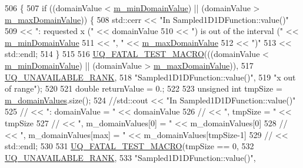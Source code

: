 \begin{DoxyCode}
506 \{
507   \textcolor{keywordflow}{if} ((domainValue < \hyperlink{class_q_u_e_s_o_1_1_base1_d1_d_function_a7b18b3854ee74ef5befbc67b75ebbdc5}{m\_minDomainValue}) || (domainValue > 
      \hyperlink{class_q_u_e_s_o_1_1_base1_d1_d_function_aa0025999ccab2145cd46c0a81e260e8f}{m\_maxDomainValue})) \{
508     std::cerr << \textcolor{stringliteral}{"In Sampled1D1DFunction::value()"}
509               << \textcolor{stringliteral}{": requested x ("}            << domainValue
510               << \textcolor{stringliteral}{") is out of the interval ("} << \hyperlink{class_q_u_e_s_o_1_1_base1_d1_d_function_a7b18b3854ee74ef5befbc67b75ebbdc5}{m\_minDomainValue}
511               << \textcolor{stringliteral}{", "}                         << \hyperlink{class_q_u_e_s_o_1_1_base1_d1_d_function_aa0025999ccab2145cd46c0a81e260e8f}{m\_maxDomainValue}
512               << \textcolor{stringliteral}{")"}
513               << std::endl;
514   \}
515 
516   \hyperlink{_defines_8h_a56d63d18d0a6d45757de47fcc06f574d}{UQ\_FATAL\_TEST\_MACRO}(((domainValue < \hyperlink{class_q_u_e_s_o_1_1_base1_d1_d_function_a7b18b3854ee74ef5befbc67b75ebbdc5}{m\_minDomainValue}) || (domainValue 
      > \hyperlink{class_q_u_e_s_o_1_1_base1_d1_d_function_aa0025999ccab2145cd46c0a81e260e8f}{m\_maxDomainValue})),
517                       \hyperlink{namespace_q_u_e_s_o_a7d4679800a430ae8e473c1c7bc0bfb21}{UQ\_UNAVAILABLE\_RANK},
518                       \textcolor{stringliteral}{"Sampled1D1DFunction::value()"},
519                       \textcolor{stringliteral}{"x out of range"});
520 
521   \textcolor{keywordtype}{double} returnValue = 0.;
522 
523   \textcolor{keywordtype}{unsigned} \textcolor{keywordtype}{int} tmpSize = \hyperlink{class_q_u_e_s_o_1_1_sampled1_d1_d_function_a6985db1a50a72a3fb1377645ac6cd944}{m\_domainValues}.size();
524   \textcolor{comment}{//std::cout << "In Sampled1D1DFunction::value()"}
525   \textcolor{comment}{//          << ": domainValue = "         << domainValue}
526   \textcolor{comment}{//          << ", tmpSize = "             << tmpSize}
527   \textcolor{comment}{//          << ", m\_domainValues[0] = "   << m\_domainValues[0]}
528   \textcolor{comment}{//          << ", m\_domainValues[max] = " << m\_domainValues[tmpSize-1]}
529   \textcolor{comment}{//          << std::endl;}
530 
531   \hyperlink{_defines_8h_a56d63d18d0a6d45757de47fcc06f574d}{UQ\_FATAL\_TEST\_MACRO}(tmpSize == 0,
532                       \hyperlink{namespace_q_u_e_s_o_a7d4679800a430ae8e473c1c7bc0bfb21}{UQ\_UNAVAILABLE\_RANK},
533                       \textcolor{stringliteral}{"Sampled1D1DFunction::value()"},

\end{DoxyCode}
